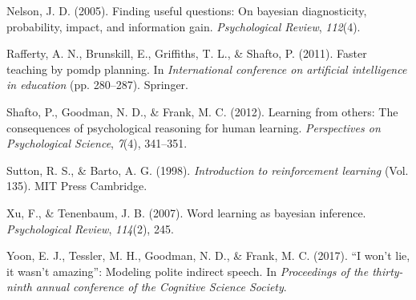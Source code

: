 \documentclass[10pt, letterpaper]{article}
\begin{document}
\leavevmode\hypertarget{ref-nelson2005}{}%
Nelson, J. D. (2005). Finding useful questions: On bayesian
diagnosticity, probability, impact, and information gain.
\emph{Psychological Review}, \emph{112}(4).

\leavevmode\hypertarget{ref-rafferty2011faster}{}%
Rafferty, A. N., Brunskill, E., Griffiths, T. L., \& Shafto, P. (2011).
Faster teaching by pomdp planning. In \emph{International conference on
artificial intelligence in education} (pp. 280--287). Springer.

\leavevmode\hypertarget{ref-shafto2012learning}{}%
Shafto, P., Goodman, N. D., \& Frank, M. C. (2012). Learning from
others: The consequences of psychological reasoning for human learning.
\emph{Perspectives on Psychological Science}, \emph{7}(4), 341--351.

\leavevmode\hypertarget{ref-sutton1998}{}%
Sutton, R. S., \& Barto, A. G. (1998). \emph{Introduction to
reinforcement learning} (Vol. 135). MIT Press Cambridge.

\leavevmode\hypertarget{ref-xu2007}{}%
Xu, F., \& Tenenbaum, J. B. (2007). Word learning as bayesian inference.
\emph{Psychological Review}, \emph{114}(2), 245.

\leavevmode\hypertarget{ref-yoon2017}{}%
Yoon, E. J., Tessler, M. H., Goodman, N. D., \& Frank, M. C. (2017). ``I
won't lie, it wasn't amazing'': Modeling polite indirect speech. In
\emph{Proceedings of the thirty-ninth annual conference of the Cognitive
Science Society}.
\end{document}
